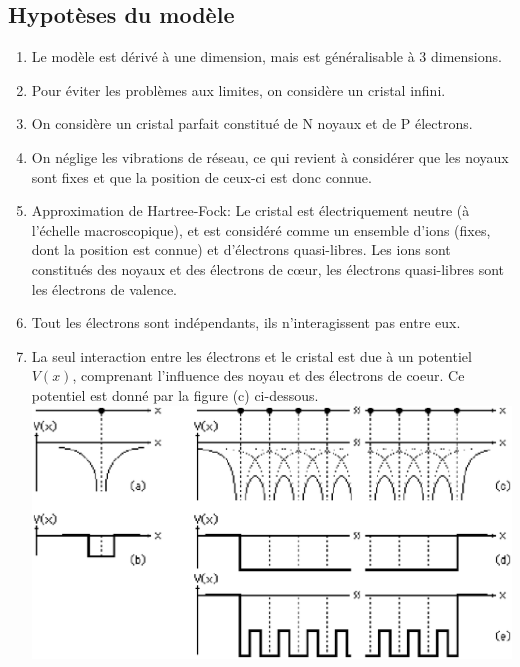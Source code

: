 \subsection{Hypotèses du modèle }
\begin{enumerate}
\item Le modèle est dérivé à une dimension, mais est généralisable à 3 dimensions.
\item Pour éviter les problèmes aux limites, on considère un cristal infini. 
\item On considère un cristal parfait constitué de N noyaux et de P électrons.
\item On néglige les vibrations de réseau, ce qui revient à considérer que les noyaux sont fixes et que la position de ceux-ci est donc connue.
\item Approximation de Hartree-Fock: Le cristal est électriquement neutre  (à l'échelle macroscopique), et est considéré comme un ensemble d'ions (fixes, dont la position est connue) et d'électrons quasi-libres. Les ions sont constitués des noyaux et des électrons de cœur, les électrons quasi-libres sont les électrons de valence.
\item Tout les électrons sont indépendants, ils n'interagissent pas entre eux.
\item La seul interaction entre les électrons et le cristal est due à un potentiel $V(x)$, comprenant l'influence des noyau et des électrons  de coeur. Ce potentiel est donné par la figure (c) ci-dessous.\\
\includegraphics[scale=0.4]{vx.eps} \\

\end{enumerate}
